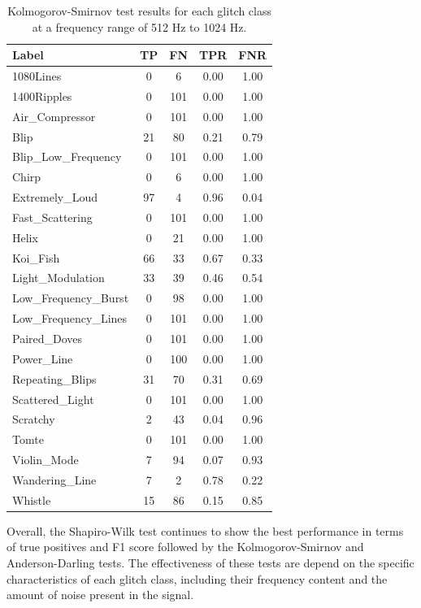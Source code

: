 \documentclass[12pt]{article}
\begin{document}
\begin{table}[H]
  \centering
  \begin{tabular}{lcccc}
  \toprule
  Label & TP & FN & TPR & FNR \\
  \midrule
  1080Lines & 0 & 6 & 0.00 & 1.00 \\
  1400Ripples & 0 & 101 & 0.00 & 1.00 \\
  Air\_Compressor & 0 & 101 & 0.00 & 1.00 \\
  Blip & 21 & 80 & 0.21 & 0.79 \\
  Blip\_Low\_Frequency & 0 & 101 & 0.00 & 1.00 \\
  Chirp & 0 & 6 & 0.00 & 1.00 \\
  Extremely\_Loud & 97 & 4 & 0.96 & 0.04 \\
  Fast\_Scattering & 0 & 101 & 0.00 & 1.00 \\
  Helix & 0 & 21 & 0.00 & 1.00 \\
  Koi\_Fish & 66 & 33 & 0.67 & 0.33 \\
  Light\_Modulation & 33 & 39 & 0.46 & 0.54 \\
  Low\_Frequency\_Burst & 0 & 98 & 0.00 & 1.00 \\
  Low\_Frequency\_Lines & 0 & 101 & 0.00 & 1.00 \\
  Paired\_Doves & 0 & 101 & 0.00 & 1.00 \\
  Power\_Line & 0 & 100 & 0.00 & 1.00 \\
  Repeating\_Blips & 31 & 70 & 0.31 & 0.69 \\
  Scattered\_Light & 0 & 101 & 0.00 & 1.00 \\
  Scratchy & 2 & 43 & 0.04 & 0.96 \\
  Tomte & 0 & 101 & 0.00 & 1.00 \\
  Violin\_Mode & 7 & 94 & 0.07 & 0.93 \\
  Wandering\_Line & 7 & 2 & 0.78 & 0.22 \\
  Whistle & 15 & 86 & 0.15 & 0.85 \\
  \bottomrule
  \end{tabular}
  \caption{Kolmogorov-Smirnov test results for each glitch class at a frequency range of 512 Hz to 1024 Hz.}
  \label{tab:ks_high_frequency_results}
\end{table}

\noindent Overall, the Shapiro-Wilk test continues to show the best performance in terms of true positives and F1 score followed by the Kolmogorov-Smirnov and Anderson-Darling tests. The effectiveness of these tests are depend on the specific characteristics of each glitch class, including their frequency content and the amount of noise present in the signal.
\end{document}
